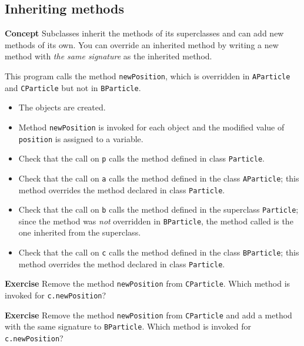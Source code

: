\subsection{Inheriting methods}\label{inher.02}

\textbf{Concept} 
Subclasses inherit the methods of its superclasses and can add new methods 
of its own. You can override an inherited method by writing a new method 
with \emph{the same signature} as the inherited method.


This program calls the method \texttt{newPosition}, which 
is overridden in \texttt{AParticle} and \texttt{CParticle} but not in 
\texttt{BParticle}.
\begin{itemize}
  \item The objects are created.
  \item Method \texttt{newPosition} is invoked for each object and the modified
  value of \texttt{position} is assigned to a variable.
  \item Check that the call on \texttt{p} calls the method defined in class 
  \texttt{Particle}.
  \item Check that the call on \texttt{a} calls the method defined 
  in the class \texttt{AParticle}; this method overrides the method declared 
  in class \texttt{Particle}.
  \item Check that the call on \texttt{b} calls the method defined 
  in the superclass \texttt{Particle}; since the method was \emph{not} overridden
  in \texttt{BParticle}, the method called is the one inherited from the superclass.
  \item Check that the call on \texttt{c} calls the method defined 
  in the class \texttt{BParticle}; this method overrides the method declared 
  in class \texttt{Particle}.
\end{itemize}

\textbf{Exercise} Remove the method \texttt{newPosition} from
\texttt{CParticle}. Which method is invoked for \texttt{c.newPosition}?

\textbf{Exercise} Remove the method \texttt{newPosition} from
\texttt{CParticle} and add a method with the same signature to
\texttt{BParticle}. Which method is invoked for \texttt{c.newPosition}?
